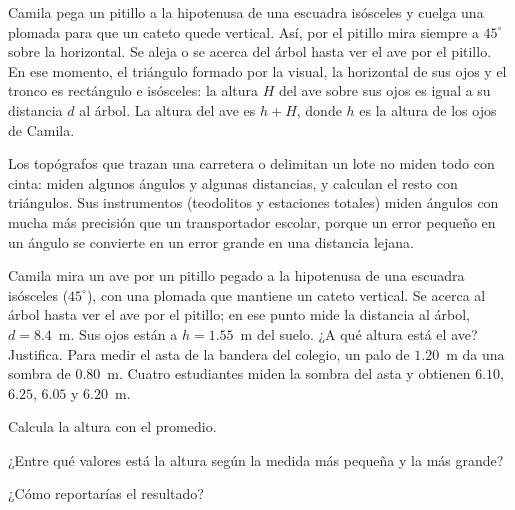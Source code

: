 \documentclass[11pt]{article}
\begin{document}
\begin{ejemplo}
Camila pega un pitillo a la hipotenusa de una escuadra isósceles y cuelga una
plomada para que un cateto quede vertical. Así, por el pitillo mira siempre a
$45^\circ$ sobre la horizontal. Se aleja o se acerca del árbol hasta ver el ave por el
pitillo. En ese momento, el triángulo formado por la visual, la horizontal de sus
ojos y el tronco es rectángulo e isósceles: la altura $H$ del ave sobre sus ojos es
igual a su distancia $d$ al árbol. La altura del ave es $h + H$, donde $h$ es la
altura de los ojos de Camila.
\begin{center}
\end{center}
\end{ejemplo}

\begin{aplicacion}[La topografía]
Los topógrafos que trazan una carretera o delimitan un lote no miden todo con
cinta: miden algunos ángulos y algunas distancias, y calculan el resto con
triángulos. Sus instrumentos (teodolitos y estaciones totales) miden ángulos con
mucha más precisión que un transportador escolar, porque un error pequeño en un
ángulo se convierte en un error grande en una distancia lejana.
\end{aplicacion}

\begin{preguntas}
\pregunta Camila mira un ave por un pitillo pegado a la hipotenusa de una escuadra
isósceles ($45^\circ$), con una plomada que mantiene un cateto vertical. Se acerca al
árbol hasta ver el ave por el pitillo; en ese punto mide la distancia al árbol,
$d = \num{8,4}$~m. Sus ojos están a $h = \num{1,55}$~m del suelo. ¿A qué altura está
el ave? Justifica.
\espacio{3cm}
\pregunta Para medir el asta de la bandera del colegio, un palo de $\num{1,20}$~m da
una sombra de $\num{0,80}$~m. Cuatro estudiantes miden la sombra del asta y obtienen
$\num{6,10}$, $\num{6,25}$, $\num{6,05}$ y $\num{6,20}$~m.
\begin{opciones}
  \item Calcula la altura con el promedio.
  \item ¿Entre qué valores está la altura según la medida más pequeña y la más grande?
  \item ¿Cómo reportarías el resultado?
\end{opciones}
\espacio{3.5cm}
\end{preguntas}
\end{document}
